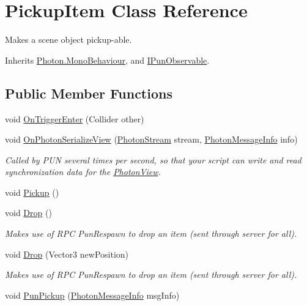 \hypertarget{class_pickup_item}{}\section{Pickup\+Item Class Reference}
\label{class_pickup_item}


Makes a scene object pickup-\/able.  




Inherits \hyperlink{class_photon_1_1_mono_behaviour}{Photon.\+Mono\+Behaviour}, and \hyperlink{interface_i_pun_observable}{I\+Pun\+Observable}.

\subsection*{Public Member Functions}
\begin{DoxyCompactItemize}
\item 
void \hyperlink{class_pickup_item_a785a8b65e46fc44ab4fdeb5411e01351}{On\+Trigger\+Enter} (Collider other)
\item 
void \hyperlink{class_pickup_item_a7b6809bac46d2eaddc309e2ad97167fa}{On\+Photon\+Serialize\+View} (\hyperlink{class_photon_stream}{Photon\+Stream} stream, \hyperlink{class_photon_message_info}{Photon\+Message\+Info} info)
\begin{DoxyCompactList}\small\item\em Called by P\+UN several times per second, so that your script can write and read synchronization data for the \hyperlink{class_photon_view}{Photon\+View}. \end{DoxyCompactList}\item 
void \hyperlink{class_pickup_item_aed8f232a2849e9640b1ba4f32077bb16}{Pickup} ()
\item 
void \hyperlink{class_pickup_item_aa23d18ee93cd9591072f01da535370bc}{Drop} ()
\begin{DoxyCompactList}\small\item\em Makes use of R\+PC Pun\+Respawn to drop an item (sent through server for all).\end{DoxyCompactList}\item 
void \hyperlink{class_pickup_item_a7fab906a78c790fe991bf63a812ae8cf}{Drop} (Vector3 new\+Position)
\begin{DoxyCompactList}\small\item\em Makes use of R\+PC Pun\+Respawn to drop an item (sent through server for all).\end{DoxyCompactList}\item 
void \hyperlink{class_pickup_item_a2a170d7c2a6c7bd0e0491ab233380186}{Pun\+Pickup} (\hyperlink{class_photon_message_info}{Photon\+Message\+Info} msg\+Info)
\end{DoxyCompactItemize}
